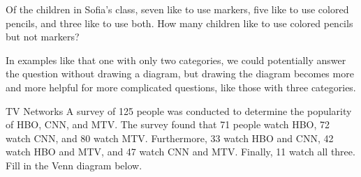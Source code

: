 \begin{try}
Of the children in Sofia's class, seven like to use markers, five like to use colored pencils, and three like to use both.  How many children like to use colored pencils but not markers?
\end{try}

In examples like that one with only two categories, we could potentially answer the question without drawing a diagram, but drawing the diagram becomes more and more helpful for more complicated questions, like those with three categories.
\vfill
\pagebreak

\begin{example}[https://www.youtube.com/watch?v=wOU7QC3X3Eo&list=PLfmpjsIzhztuvrh-T2Owgo_gO84qypSBG&index=23]{TV Networks}
A survey of 125 people was conducted to determine the popularity of HBO, CNN, and MTV.  The survey found that 71 people watch HBO, 72 watch CNN, and 80 watch MTV.  Furthermore, 33 watch HBO and CNN, 42 watch HBO and MTV, and 47 watch CNN and MTV.  Finally, 11 watch all three.\\

Fill in the Venn diagram below.

\begin{center}
\end{center}
\end{example}
